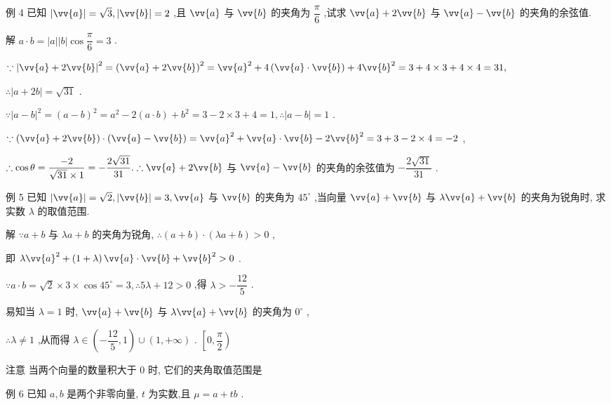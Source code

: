 例 4 已知 $\left| \vv{a}\right|  = \sqrt{3},\left| \vv{b}\right|  = 2$ ,且 $\vv{a}$ 与 $\vv{b}$ 的夹角为 $\dfrac{\pi }{6}$ ,试求 $\vv{a} + 2\vv{b}$ 与 $\vv{a} - \vv{b}$ 的夹角的余弦值.

解 $a \cdot  b = \left| a\right| \left| b\right| \cos \dfrac{\pi }{6} = 3$ .

$\because {\left| \vv{a} + 2\vv{b}\right| }^{2} = {\left( \vv{a} + 2\vv{b}\right) }^{2} = {\vv{a}}^{2} + 4\left( {\vv{a} \cdot  \vv{b}}\right)  + 4{\vv{b}}^{2} = 3 + 4 \times  3 + 4 \times  4 = {31},$

$\therefore \left| {a + {2b}}\right|  = \sqrt{31}$ .

$\because {\left| a - b\right| }^{2} = {\left( a - b\right) }^{2} = {a}^{2} - 2\left( {a \cdot  b}\right)  + {b}^{2} = 3 - 2 \times  3 + 4 = 1,\therefore \left| {a - b}\right|  = 1$ .

$\because \left( {\vv{a} + 2\vv{b}}\right)  \cdot  \left( {\vv{a} - \vv{b}}\right)  = {\vv{a}}^{2} + \vv{a} \cdot  \vv{b} - 2{\vv{b}}^{2} = 3 + 3 - 2 \times  4 =  - 2$ ,

$\therefore \cos \theta  = \dfrac{-2}{\sqrt{31} \times  1} =  - \dfrac{2\sqrt{31}}{31}.\therefore \vv{a} + 2\vv{b}$ 与 $\vv{a} - \vv{b}$ 的夹角的余弦值为 $- \dfrac{2\sqrt{31}}{31}$ .

例 5 已知 $\left| \vv{a}\right|  = \sqrt{2},\left| \vv{b}\right|  = 3,\vv{a}$ 与 $\vv{b}$ 的夹角为 ${45}^{ \circ  }$ ,当向量 $\vv{a} + \vv{b}$ 与 $\lambda \vv{a} + \vv{b}$ 的夹角为锐角时, 求实数 $\lambda$ 的取值范围.

解 $\because a + b$ 与 ${\lambda a} + b$ 的夹角为锐角, $\therefore \left( {a + b}\right)  \cdot  \left( {{\lambda a} + b}\right)  > 0$ ,

即 $\lambda {\vv{a}}^{2} + \left( {1 + \lambda }\right) \vv{a} \cdot  \vv{b} + {\vv{b}}^{2} > 0$ .

$\because a \cdot  b = \sqrt{2} \times  3 \times  \cos {45}^{ \circ  } = 3,\therefore {5\lambda } + {12} > 0$ ,得 $\lambda  >  - \dfrac{12}{5}$ .

易知当 $\lambda  = 1$ 时, $\vv{a} + \vv{b}$ 与 $\lambda \vv{a} + \vv{b}$ 的夹角为 ${0}^{ \circ  }$ ,

$\therefore \lambda  \neq  1$ ,从而得 $\lambda  \in  \left( {-\dfrac{12}{5},1}\right)  \cup  \left( {1, + \infty }\right)$ . $\left\lbrack  {0,\dfrac{\pi }{2}}\right)$

注意 当两个向量的数量积大于 0 时, 它们的夹角取值范围是

例 6 已知 $a,b$ 是两个非零向量, $t$ 为实数,且 $\mu  = a + {tb}$ .

